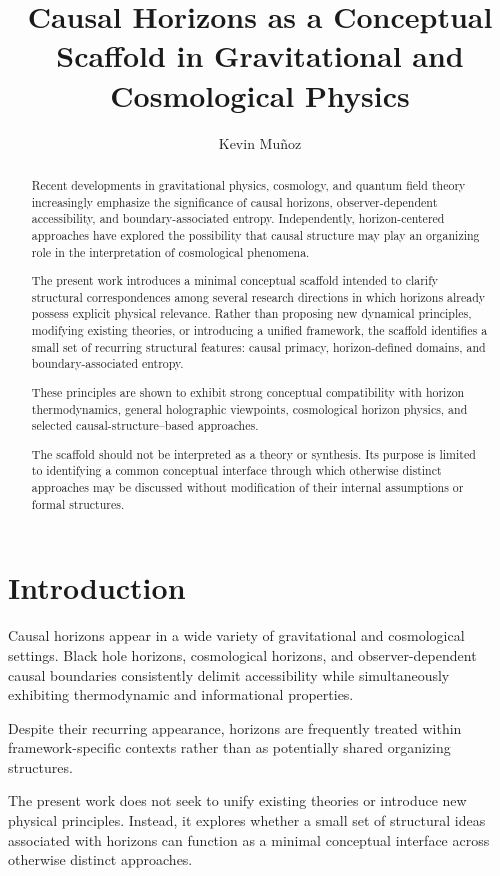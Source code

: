 \documentclass[12pt,a4paper]{article}
\title{Causal Horizons as a Conceptual Scaffold in Gravitational and Cosmological Physics}
\author{Kevin Mu\~noz}
\date{}
\begin{document}
\maketitle

\begin{abstract}
Recent developments in gravitational physics, cosmology, and quantum field theory increasingly emphasize the significance of causal horizons, observer-dependent accessibility, and boundary-associated entropy. Independently, horizon-centered approaches have explored the possibility that causal structure may play an organizing role in the interpretation of cosmological phenomena.

The present work introduces a minimal conceptual scaffold intended to clarify structural correspondences among several research directions in which horizons already possess explicit physical relevance. Rather than proposing new dynamical principles, modifying existing theories, or introducing a unified framework, the scaffold identifies a small set of recurring structural features: causal primacy, horizon-defined domains, and boundary-associated entropy.

These principles are shown to exhibit strong conceptual compatibility with horizon thermodynamics, general holographic viewpoints, cosmological horizon physics, and selected causal-structure--based approaches.

The scaffold should not be interpreted as a theory or synthesis. Its purpose is limited to identifying a common conceptual interface through which otherwise distinct approaches may be discussed without modification of their internal assumptions or formal structures.
\end{abstract}

\section{Introduction}

Causal horizons appear in a wide variety of gravitational and cosmological settings. Black hole horizons, cosmological horizons, and observer-dependent causal boundaries consistently delimit accessibility while simultaneously exhibiting thermodynamic and informational properties.

Despite their recurring appearance, horizons are frequently treated within framework-specific contexts rather than as potentially shared organizing structures.

The present work does not seek to unify existing theories or introduce new physical principles. Instead, it explores whether a small set of structural ideas associated with horizons can function as a minimal conceptual interface across otherwise distinct approaches.
\end{document}
